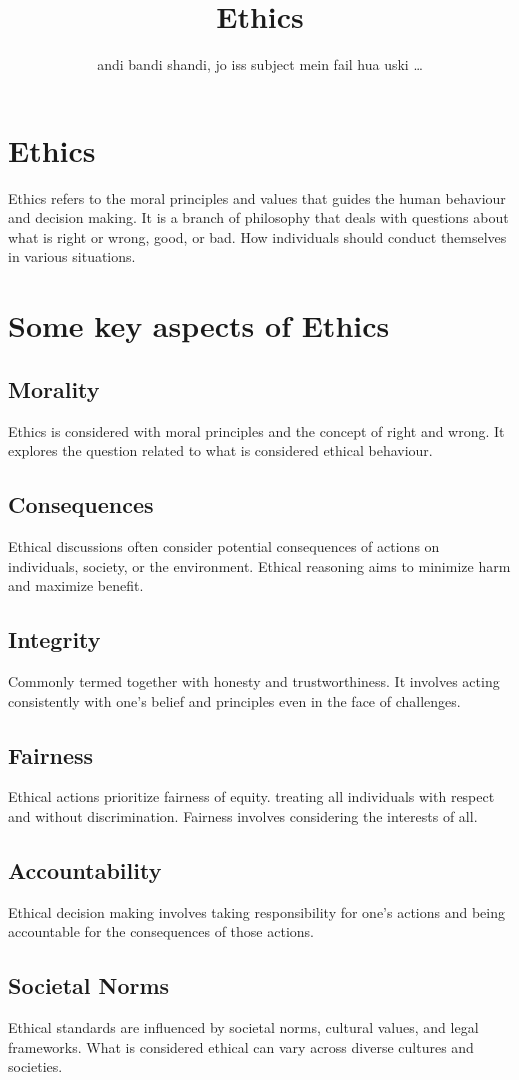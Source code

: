 \documentclass{report}
\title{Ethics}
\date{}
\author{andi bandi shandi, jo iss subject mein fail hua uski \dots}
\begin{document}
\maketitle
\section*{Ethics}
Ethics refers to the moral principles and values that guides the human behaviour and decision making. It is a branch of philosophy that deals with questions about what is right or wrong, good, or bad. How individuals should conduct themselves in various situations.
\section*{Some key aspects of Ethics}
\subsection*{Morality}
Ethics is considered with moral principles and the concept of right and wrong. It explores the question related to what is considered ethical behaviour.
\subsection*{Consequences}
Ethical discussions often consider potential consequences of actions on individuals, society, or the environment. Ethical reasoning aims to minimize harm and maximize benefit.
\subsection*{Integrity}
Commonly termed together with honesty and trustworthiness. It involves acting consistently with one's belief and principles even in the face of challenges.
\subsection*{Fairness}
Ethical actions prioritize fairness of equity. treating all individuals with respect and without discrimination. Fairness involves considering the interests of all.
\subsection*{Accountability}
Ethical decision making involves taking responsibility for one's actions and being accountable for the consequences of those actions.
\subsection*{Societal Norms}
Ethical standards are influenced by societal norms, cultural values, and legal frameworks. What is considered ethical can vary across diverse cultures and societies.
\end{document}
